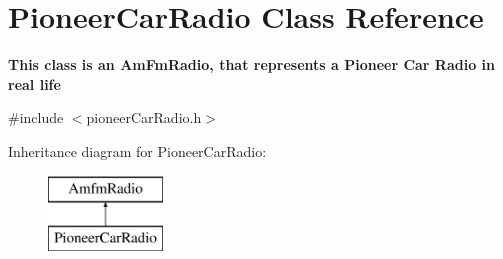 \hypertarget{class_pioneer_car_radio}{\section{Pioneer\-Car\-Radio Class Reference}
\label{class_pioneer_car_radio}
}


{\bfseries This class is an Am\-Fm\-Radio, that represents a Pioneer Car Radio in real life}  




{\ttfamily \#include $<$pioneer\-Car\-Radio.\-h$>$}

Inheritance diagram for Pioneer\-Car\-Radio\-:\begin{figure}[H]
\begin{center}
\leavevmode
\includegraphics[height=2.000000cm]{class_pioneer_car_radio}
\end{center}
\end{figure}
